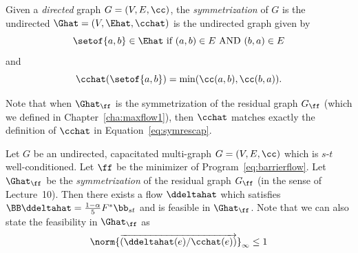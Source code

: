  \begin{definition}
   Given a \emph{directed} graph $G = (V,E,\cc)$, the
   \emph{symmetrization}
   of $G$ is the undirected $\Ghat = (V,\Ehat,\cchat)$ is the undirected graph given by
\[
\setof{a,b} \in \Ehat \text{ if } (a,b) \in E \text{ AND } (b,a) \in E    
\]
and
\[
  \cchat(\setof{a,b}) = \min(\cc(a,b),\cc(b,a))
  .
\]
\end{definition}
Note that when  $\Ghat_{\ff}$ is the symmetrization of the residual
   graph $G_{\ff}$ (which we defined in Chapter~\ref{cha:maxflow1}), then $\cchat$ matches
   exactly the definition of $\cchat$ in Equation~\eqref{eq:symrescap}.
\begin{lemma}
\label{lem:symres}
  Let $G$ be an undirected, capacitated multi-graph $G = (V,E,\cc)$
  which is $s$-$t$ well-conditioned.
   Let $\ff$ be the minimizer of Program~\eqref{eq:barrierflow}.
   Let $\Ghat_{\ff}$ be the \emph{symmetrization} of the residual
   graph $G_{\ff}$ (in the sense of Lecture~10).
   Then there exists a flow $\ddeltahat$ which satisfies $\BB \ddeltahat = \frac{1-\alpha}{5} F^*
   \bb_{st} $ and is feasible in
   $\Ghat_{\ff}$. Note that we can also state the feasibility in
   $\Ghat_{\ff}$ as
   \[
\norm{\cvec{\ddeltahat(e)/\cchat(e)}}_{\infty} \leq 1
     \]
\end{lemma}
